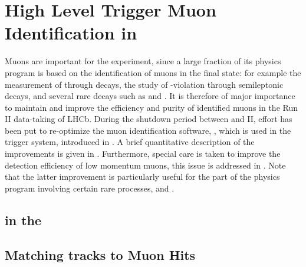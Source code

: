 \chapter{High Level Trigger Muon Identification in \runtwo}
\label{Muon_id_hlt}

Muons are important for the \lhcb experiment, since a large fraction of its physics program is based on
the identification of muons in the final state: for example the measurement of \phis through \BsJpsiPhi decays,
the study of \CP-violation through semileptonic decays, and several rare decays such as \BdKstmumu and \Bsmm.
It is therefore of major importance to maintain and improve the efficiency and purity of identified muons in
the Run II data-taking of LHCb. During the shutdown period between \runone and II, effort has been put to
re-optimize the muon identification software, \muonID, which is used in the \lhcb trigger system, introduced in .
A brief quantitative description of the \muonID improvements is given in .
Furthermore, special care is taken to improve the detection efficiency of low momentum muons, this issue is
addressed in . Note that the latter improvement is particularly useful for the part
of the \lhcb physics program involving certain rare processes, \eg \Sigmapmumu \cite{LHCB-CONF-2016-013-001} and \Ksmumu \cite{LHCb-CONF-2016-012}.

\section{\hltone \muonID in the \lhc \runtwo}
\label{muid_hlt1}


\section{Matching \velo tracks to Muon Hits}
\label{mvm_algorrithm}


